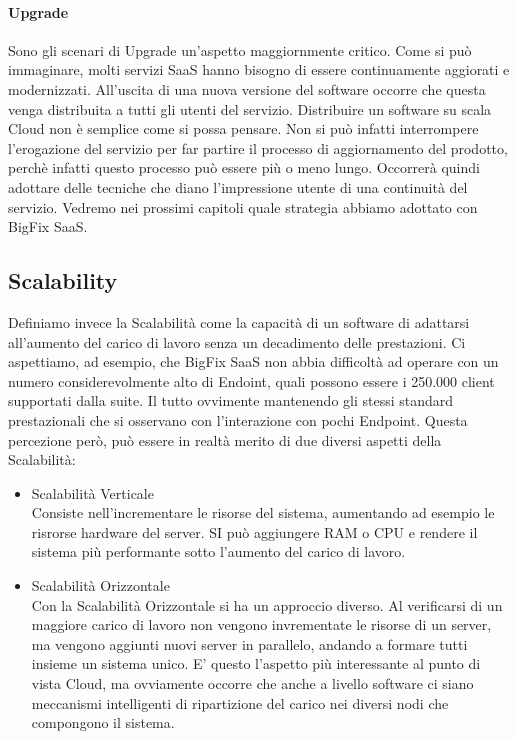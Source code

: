 \paragraph{Upgrade}
Sono gli scenari di Upgrade un'aspetto maggiornmente critico. Come si può immaginare, molti servizi SaaS hanno bisogno di essere continuamente aggiorati e modernizzati. All'uscita di una nuova versione del software occorre che questa venga distribuita a tutti gli utenti del servizio. Distribuire un software su scala Cloud non è semplice come si possa pensare. Non si può infatti interrompere l'erogazione del servizio per far partire il processo di aggiornamento del prodotto, perchè infatti questo processo può essere più o meno lungo. Occorrerà quindi adottare delle tecniche che diano l'impressione utente di una continuità del servizio. Vedremo nei prossimi capitoli quale strategia abbiamo adottato con BigFix SaaS. 

\subsection{Scalability}
Definiamo invece la Scalabilità come la capacità di un software di adattarsi all'aumento del carico di lavoro senza un decadimento delle prestazioni. Ci aspettiamo, ad esempio, che BigFix SaaS non abbia difficoltà ad operare con un numero considerevolmente alto di Endoint, quali possono essere i 250.000 client supportati dalla suite. Il tutto ovvimente mantenendo gli stessi standard prestazionali che si osservano con l'interazione con pochi Endpoint. Questa percezione però, può essere in realtà merito di due diversi aspetti della Scalabilità:
\begin{itemize}
	\item  Scalabilità Verticale \\
	Consiste nell'incrementare le risorse del sistema, aumentando ad esempio le risrorse hardware del server. SI può aggiungere RAM o CPU e rendere il sistema più performante sotto l'aumento del carico di lavoro.
	
	\item  Scalabilità Orizzontale \\
	Con la Scalabilità Orizzontale si ha un approccio diverso. Al verificarsi di un maggiore carico di lavoro non vengono invrementate le risorse di un server, ma vengono aggiunti nuovi server in parallelo, andando a formare tutti insieme un sistema unico. E' questo l'aspetto più interessante al punto di vista Cloud, ma ovviamente occorre che anche a livello software ci siano meccanismi intelligenti di ripartizione del carico nei diversi nodi che  compongono il sistema.
\end{itemize}

